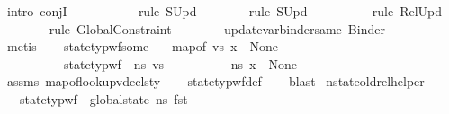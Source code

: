 \begin{isabellebody}
\ {\isacharparenleft}{\kern0pt}intro\ conjI{\isacharparenright}{\kern0pt}\isanewline
\ \ \ \ \ \ \ \ \ \isamarkupfalse%
\ {\isacharparenleft}{\kern0pt}rule\ S{}Upd{\isacharparenright}{\kern0pt}\isanewline
\ \ \ \ \ \ \isamarkupfalse%
\ {\isacharparenleft}{\kern0pt}rule\ S{}Upd{\isacharparenright}{\kern0pt}\isanewline
\ \ \ \ \ \ \ \ \isamarkupfalse%
\ {\isacharparenleft}{\kern0pt}rule\ Rel{}Upd{\isacharparenright}{\kern0pt}\isanewline
\ \ \ \ \ \ \isamarkupfalse%
\ {\isacharparenleft}{\kern0pt}rule\ GlobalConstraint{\isacharparenright}{\kern0pt}\isanewline
\ \ \ \ \ \ \isamarkupfalse%
\ update{\isacharunderscore}{\kern0pt}var{\isacharunderscore}{\kern0pt}binder{\isacharunderscore}{\kern0pt}same\ Binder{}\ \isanewline
\ \ \ \ \ \ \isamarkupfalse%
\ metis\isanewline
\ \ \isamarkupfalse%
%
\endisatagproof
{\isafoldproof}%
%
\isadelimproof
\isanewline
%
\endisadelimproof
\isanewline
{}\isamarkupfalse%
\ state{\isacharunderscore}{\kern0pt}typ{\isacharunderscore}{\kern0pt}wf{\isacharunderscore}{\kern0pt}some{\isacharcolon}{\kern0pt}\isanewline
\ \ \ {\isachardoublequoteopen}map{\isacharunderscore}{\kern0pt}of\ vs\ x\ {\isasymnoteq}\ None{\isachardoublequoteclose}\ \isanewline
\ \ \ \ \ \ \ \ \ \ {\isachardoublequoteopen}state{\isacharunderscore}{\kern0pt}typ{\isacharunderscore}{\kern0pt}wf\ {\isasymOmega}\ ns\ vs{\isachardoublequoteclose}\ \isanewline
\ \ \ \ \ \ \ \ \ {\isachardoublequoteopen}ns\ x\ {\isasymnoteq}\ None{\isachardoublequoteclose}\isanewline
%
\isadelimproof
\ \ %
\endisadelimproof
%
\isatagproof
{}\isamarkupfalse%
\ assms\ map{\isacharunderscore}{\kern0pt}of{\isacharunderscore}{\kern0pt}lookup{\isacharunderscore}{\kern0pt}vdecls{\isacharunderscore}{\kern0pt}ty\isanewline
\ \ \isamarkupfalse%
\ state{\isacharunderscore}{\kern0pt}typ{\isacharunderscore}{\kern0pt}wf{\isacharunderscore}{\kern0pt}def\isanewline
\ \ \isamarkupfalse%
\ blast%
\endisatagproof
{\isafoldproof}%
%
\isadelimproof
\isanewline
%
\endisadelimproof
\isanewline
{}\isamarkupfalse%
\ nstate{\isacharunderscore}{\kern0pt}old{\isacharunderscore}{\kern0pt}rel{\isacharunderscore}{\kern0pt}helper{\isacharcolon}{\kern0pt}\isanewline
\ \ \ {\isachardoublequoteopen}state{\isacharunderscore}{\kern0pt}typ{\isacharunderscore}{\kern0pt}wf\ {\isacharbrackleft}{\kern0pt}{\isacharbrackright}{\kern0pt}\ {\isacharparenleft}{\kern0pt}global{\isacharunderscore}{\kern0pt}state\ ns{\isacharparenright}{\kern0pt}\ {\isacharparenleft}{\kern0pt}fst\ {\isasymLambda}{}{\isacharparenright}{\kern0pt}{\isachardoublequoteclose}\ \isanewline

\end{isabellebody}
